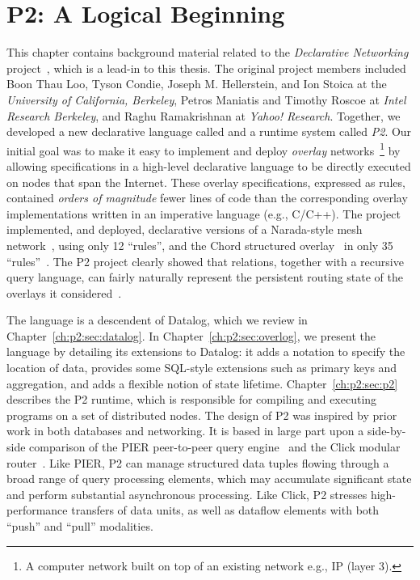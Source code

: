 \chapter[P2: A Logical Beginning]{P2: A Logical Beginning}
\label{ch:p2}

This chapter contains background material related to the {\em Declarative
Networking} project~\cite{boon-thesis}, which is a lead-in to this thesis.  The
original project members included Boon Thau Loo, Tyson Condie, Joseph M.
Hellerstein, and Ion Stoica at the {\em University of California, Berkeley},
Petros Maniatis and Timothy Roscoe at {\em Intel Research Berkeley}, and Raghu
Ramakrishnan at {\em Yahoo!  Research}.  Together, we developed a new
declarative language called {\em \OVERLOG} and a runtime system called {\em
P2}.  Our initial goal was to make it easy to implement and deploy {\em
overlay} networks~\footnote{A computer network built on top of an existing
network e.g., IP (layer 3).} by allowing specifications in a high-level
declarative language to be directly executed on nodes that span the Internet.
These overlay specifications, expressed as \OVERLOG rules, contained {\em
orders of magnitude} fewer lines of code than the corresponding overlay
implementations written in an imperative language (e.g., C/C++).  The project
implemented, and deployed, declarative versions of a Narada-style mesh
network~\cite{chu00case}, using only 12 ``rules'', and the Chord structured
overlay~\cite{chord} in only 35 ``rules''~\cite{p2:sosp}.  The P2 project
clearly showed that relations, together with a recursive query language, can
fairly naturally represent the persistent routing state of the overlays it
considered~\cite{boon-thesis}.

The \OVERLOG language is a descendent of Datalog, which we review in
Chapter~\ref{ch:p2:sec:datalog}.  In Chapter~\ref{ch:p2:sec:overlog}, we
present the \OVERLOG language by detailing its extensions to Datalog: it adds a
notation to specify the location of data, provides some SQL-style extensions
such as primary keys and aggregation, and adds a flexible notion of state
lifetime.  Chapter~\ref{ch:p2:sec:p2} describes the P2 runtime, which is
responsible for compiling and executing \OVERLOG programs on a set of
distributed nodes.  The design of P2 was inspired by prior work in both
databases and networking.  It is based in large part upon a side-by-side
comparison of the PIER peer-to-peer query engine~\cite{pier-cidr05} and the
Click modular router~\cite{click-tocs}.  Like PIER, P2 can manage structured
data tuples flowing through a broad range of query processing elements, which
may accumulate significant state and perform substantial asynchronous
processing.  Like Click, P2 stresses high-performance transfers of data units,
as well as dataflow elements with both ``push'' and ``pull'' modalities.

